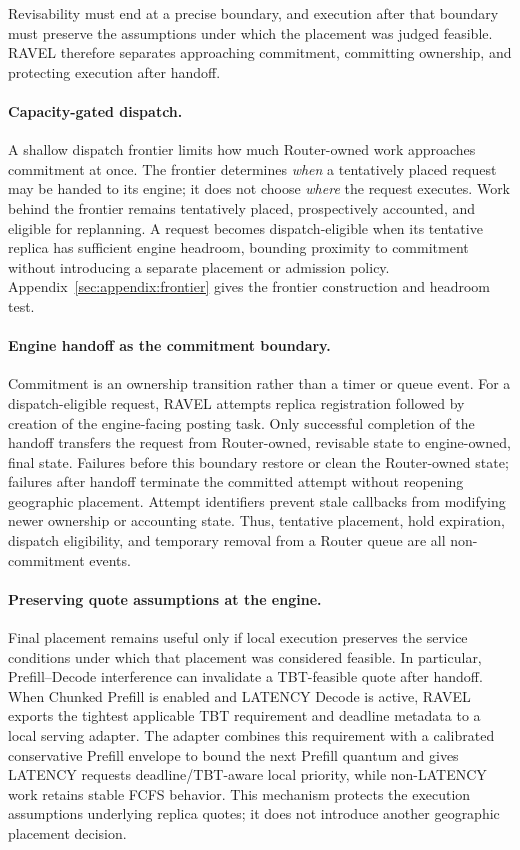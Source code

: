 \documentclass[letterpaper,twocolumn,10pt]{article}
\begin{document}
Revisability must end at a precise boundary, and execution after that boundary
must preserve the assumptions under which the placement was judged feasible.
RAVEL therefore separates approaching commitment, committing ownership, and
protecting execution after handoff.

\paragraph{Capacity-gated dispatch.}
A shallow dispatch frontier limits how much Router-owned work approaches
commitment at once.
The frontier determines \emph{when} a tentatively placed request may be handed
to its engine; it does not choose \emph{where} the request executes.
Work behind the frontier remains tentatively placed, prospectively accounted,
and eligible for replanning.
A request becomes dispatch-eligible when its tentative replica has sufficient
engine headroom, bounding proximity to commitment without introducing a
separate placement or admission policy.
Appendix~\ref{sec:appendix:frontier} gives the frontier construction and
headroom test.

\paragraph{Engine handoff as the commitment boundary.}
Commitment is an ownership transition rather than a timer or queue event.
For a dispatch-eligible request, RAVEL attempts replica registration followed
by creation of the engine-facing posting task.
Only successful completion of the handoff transfers the request from
Router-owned, revisable state to engine-owned, final state.
Failures before this boundary restore or clean the Router-owned state; failures
after handoff terminate the committed attempt without reopening geographic
placement.
Attempt identifiers prevent stale callbacks from modifying newer ownership or
accounting state.
Thus, tentative placement, hold expiration, dispatch eligibility, and temporary
removal from a Router queue are all non-commitment events.

\paragraph{Preserving quote assumptions at the engine.}
Final placement remains useful only if local execution preserves the service
conditions under which that placement was considered feasible.
In particular, Prefill--Decode interference can invalidate a TBT-feasible
quote after handoff.
When Chunked Prefill is enabled and LATENCY Decode is active, RAVEL exports the
tightest applicable TBT requirement and deadline metadata to a local serving
adapter.
The adapter combines this requirement with a calibrated conservative Prefill
envelope to bound the next Prefill quantum and gives LATENCY requests
deadline/TBT-aware local priority, while non-LATENCY work retains stable FCFS
behavior.
This mechanism protects the execution assumptions underlying replica quotes;
it does not introduce another geographic placement decision.
\end{document}
